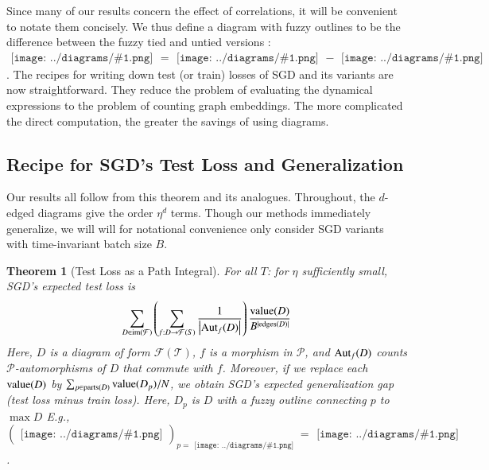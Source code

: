 \documentclass{article}
\newtheorem{thm}{Theorem}
\newcommand{\Free}{\mathcal{F}}
\newcommand{\Aut}{\text{\textnormal{Aut}}}
\newcommand{\image}{\text{\textnormal{im}}}
\newcommand{\dvalue}{\text{\textnormal{value}}}
\newcommand{\edges}{\text{\textnormal{edges}}}
\newcommand{\parts}{\text{\textnormal{parts}}}
\newcommand{\Pp}{\mathcal{P}}
\newcommand{\Tt}{\mathcal{T}}
\newcommand{\wrap}[1]{\left(#1\right)}
\newcommand{\wabs}[1]{\left|#1\right|}
\newcommand{\sdia}[1]{\begin{gathered}\texttt{[image: ../diagrams/\#1.png]}\end{gathered}}
\begin{document}
        Since many of our results concern the effect of correlations, it will
        be convenient to notate them concisely.  We thus define a diagram with
        fuzzy outlines to be the difference between the fuzzy tied and untied
        versions : $\sdia{c(01-2)(01-12)} =
        \sdia{(01-2)(01-12)}-\sdia{(0-1-2)(01-12)}$.  
        The recipes for writing down test (or train) losses of SGD and its
        variants are now straightforward.  They reduce the problem of
        evaluating the dynamical expressions to the problem of
        counting graph embeddings.  The more complicated the direct
        computation, the greater the savings of using diagrams.  
    

    \subsection{Recipe for SGD's Test Loss and Generalization}

        Our results all follow from this theorem and its analogues.
        Throughout, the $d$-edged diagrams give the order $\eta^d$ terms.
        Though our methods immediately generalize, we will will for notational
        convenience only consider SGD variants with time-invariant batch size
        $B$. 
        \begin{thm}[Test Loss as a Path Integral] \label{thm:sgdcoef}
            For all $T$: for $\eta$ sufficiently small, SGD's expected test
            loss is
            \begin{equation}\label{eq:sgdcoef}
                \sum_{D \in \image(\Free)} \wrap{
                    \sum_{f: D\to\Free(S)}
                    \frac{1}{\wabs{\Aut_f(D)}}
                }
                \frac{\dvalue(D)}{B^{|\edges(D)|}}
            \end{equation}
            Here, $D$ is a diagram of form $\Free(\Tt)$,
            $f$ is a morphism in $\Pp$, and $\Aut_f(D)$ counts
            $\Pp$-automorphisms of $D$ that commute with $f$. 
            Moreover, if we replace each $\dvalue(D)$ by
            $
                \sum_{p \in \parts(D)} \dvalue(D_p)/N
            $, we obtain
            SGD's expected generalization gap (test loss minus train loss).
            Here, $D_p$ is $D$ with a fuzzy outline connecting $p$ to $\max D$
            E.g., $(\sdia{(0-1)(01)})_{p=\sdia{(0)()}} =
            \sdia{c(01)(01)}$.
        \end{thm}
    
\end{document}
